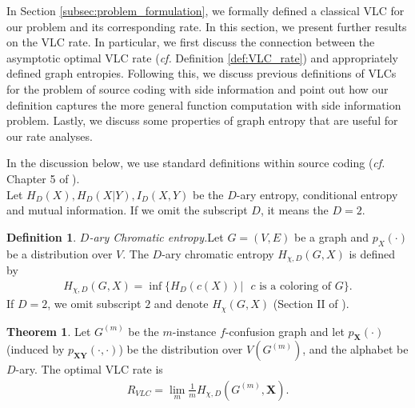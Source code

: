 \documentclass[journal, onecolumn, draftcls]{IEEEtran}
\theoremstyle{definition}
\newtheorem{theorem}{Theorem}
\newtheorem{definition}{Definition}
\newcommand{\bfX}{\mathbf{X}}
\newcommand{\bfY}{\mathbf{Y}}
\newcommand{\meng}[1]{\marginpar{+}{\bf Ruoyu's remark}: {\em #1}}
\begin{document}
In Section \ref{subsec:problem_formulation}, we formally defined a classical VLC for our problem and its corresponding rate. In this section, we present further results on the VLC rate. In particular, we first discuss the connection between the asymptotic optimal VLC rate ({\it cf.} Definition \ref{def:VLC_rate}) and appropriately defined graph entropies. Following this, we discuss previous definitions of VLCs for the problem of source coding with side information \cite{AlonO_96} and 
point out how our definition captures the more general function computation with side information problem. Lastly, we discuss some properties of graph entropy that are useful for our rate analyses.

 

In the discussion below, we use standard definitions within source coding ({\it cf.} Chapter 5 of \cite{CoverT05}).\\  Let $H_D(X),H_D(X|Y),I_D(X,Y)$ be the $D$-ary entropy, conditional entropy and mutual information. If we omit the subscript $D$, it means the $D=2$. %

\begin{definition}{ \it $D$-ary  Chromatic entropy.}\label{def:chromatic_entropy}
Let $G=(V,E)$ be a graph and $p_X(\cdot)$ be a distribution over $V$.  The $D$-ary chromatic
entropy $H_{\chi,D}(G,X)$ is defined by
\begin{align*}
    H_{\chi,D}(G,X)=\inf \{H_D(c(X))|\text{ $c$ is a coloring of $G$}\}.
\end{align*}
If $D=2$, we omit subscript $2$ and denote $H_{\chi}(G,X)$ (Section II of \cite{AlonO_96}).%

\end{definition}


\begin{theorem}\label{thm:VLC_optimal_rate}
Let $G^{(m)}$ be the $m$-instance $f$-confusion graph and let $p_\bfX(\cdot)$ (induced by $p_{\bfX\bfY}(\cdot,\cdot)$) be the distribution over $V(G^{(m)})$, and the alphabet be $D$-ary.  The optimal VLC rate  is
    \begin{align*}
        R_{VLC}    = \lim_m\frac{1}{m} H_{\chi,D}(G^{(m)},\bfX).
    \end{align*}
\end{theorem}
 
\end{document}
